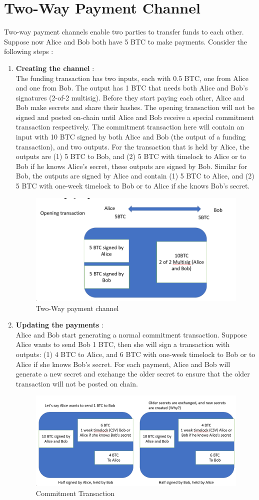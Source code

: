 \section{Two-Way Payment Channel}
Two-way payment channels enable two parties to transfer funds to each other. Suppose now Alice
and Bob both have 5 BTC to make payments. Consider the following steps :
\begin{enumerate}
	\item \textbf{Creating the channel} : \\
	The funding transaction has two inputs, each with 0.5 BTC, one from Alice and one from Bob. The output has 1 BTC that needs both Alice and Bob’s signatures (2-of-2 multisig). Before they start paying each other, Alice and Bob make secrets and share their hashes. The opening transaction will not be signed and posted on-chain until Alice and Bob receive a
	special commitment transaction respectively. The commitment transaction here will contain
	an input with 10 BTC signed by both Alice and Bob (the output of a funding transaction), and
	two outputs. For the transaction that is held by Alice, the outputs are (1) 5 BTC to Bob,
	and (2) 5 BTC with timelock to Alice or to Bob if he knows Alice’s secret, these outputs are
	signed by Bob. Similar for Bob, the outputs are signed by Alice and contain (1) 5 BTC to
	Alice, and (2) 5 BTC with one-week timelock to Bob or to Alice if she knows Bob’s secret.
	\begin{figure}[h!]
		\centering
		\includegraphics[width=0.4\linewidth]{Fig/13/F4}
		\caption{Two-Way payment channel}
		\label{fig:L13_f4}
	\end{figure}
	
	\item \textbf{Updating the payments} : \\
	Alice and Bob start generating a normal commitment transaction. Suppose Alice wants to send Bob 1 BTC, then she will sign a transaction with outputs: (1) 4 BTC to Alice, and 6 BTC with one-week timelock to Bob or to Alice if she knows
	Bob’s secret. For each payment, Alice and Bob will generate a new secret and exchange the older secret to ensure that the older transaction will not be posted on chain.
	\begin{figure}[h!]
		\centering
		\includegraphics[width=0.5\linewidth]{Fig/13/F5}
		\caption{Commitment Transaction}
		\label{fig:L13_f5}
	\end{figure}
	

\end{enumerate}
